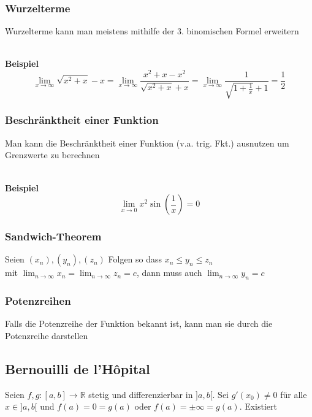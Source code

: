 \documentclass[a4paper, fontsize = 8pt, landscape]{scrartcl}
\newenvironment {example}
				{\begin{itshape} \begin{small}}
				{\end{small} \end{itshape}}
\newcommand{\R}[0]{\mathbb{R}}
\begin{document}
\begin{multicols*}{3}
    \subsubsection{Wurzelterme}
    Wurzelterme kann man meistens mithilfe der 3. binomischen Formel erweitern\\\\
    \begin{example}
        \textbf{Beispiel}
        \begin{equation*}
            \lim_{x \rightarrow \infty} \sqrt{x^2+x}-x = \lim_{x \rightarrow \infty} \frac{x^2+x-x^2}{\sqrt{x^2+x}+x} = \lim_{x \rightarrow \infty} \frac{1}{\sqrt{1+\frac{1}{x}}+1}=\frac{1}{2}
        \end{equation*}
    \end{example}
    \subsubsection{Beschränktheit einer Funktion}
    Man kann die Beschränktheit einer Funktion (v.a. trig. Fkt.) ausnutzen um Grenzwerte zu berechnen\\\\
    \begin{example}
        \textbf{Beispiel}
        \begin{equation*}
            \lim_{x \rightarrow 0} x^2 \sin \left(\frac{1}{x} \right) = 0
        \end{equation*}
    \end{example}
    \subsubsection{Sandwich-Theorem}
    Seien $(x_n),(y_n),(z_n)$ Folgen so dass $x_n\le y_n\le z_n$\\ mit $\lim_{n \rightarrow \infty} x_n= \lim_{n \rightarrow \infty} z_n=c$, dann muss auch $\lim_{n \rightarrow \infty} y_n=c $
    \subsubsection{Potenzreihen}
    Falls die Potenzreihe der Funktion bekannt ist, kann man sie durch die Potenzreihe darstellen
    \subsection{Bernouilli de l'Hôpital}

    Seien $f,g: [a,b] \to \R$ stetig und differenzierbar in $]a,b[$. Sei $g'(x_0) \neq 0$ für alle $x \in ]a,b[$ und $f(a) = 0 = g(a)$ oder $f(a) = \pm \infty = g(a)$. Existiert


\end{multicols*}
\end{document}
